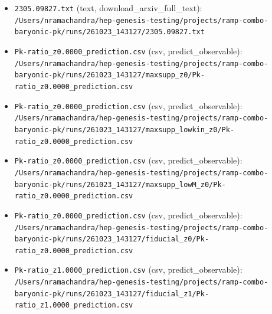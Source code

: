 \documentclass[11pt,a4paper]{article}
\begin{document}
\begin{itemize}
  \item \texttt{2305.09827.txt} (text, download\_arxiv\_full\_text): \texttt{/\allowbreak{}Users/\allowbreak{}nramachandra/\allowbreak{}hep-genesis-testing/\allowbreak{}projects/\allowbreak{}ramp-combo-baryonic-pk/\allowbreak{}runs/\allowbreak{}261023\_\allowbreak{}143127/\allowbreak{}2305.09827.txt}
  \item \texttt{Pk-ratio\_\allowbreak{}z0.0000\_\allowbreak{}prediction.csv} (csv, predict\_observable): \texttt{/\allowbreak{}Users/\allowbreak{}nramachandra/\allowbreak{}hep-genesis-testing/\allowbreak{}projects/\allowbreak{}ramp-combo-baryonic-pk/\allowbreak{}runs/\allowbreak{}261023\_\allowbreak{}143127/\allowbreak{}maxsupp\_\allowbreak{}z0/\allowbreak{}Pk-ratio\_\allowbreak{}z0.0000\_\allowbreak{}prediction.csv}
  \item \texttt{Pk-ratio\_\allowbreak{}z0.0000\_\allowbreak{}prediction.csv} (csv, predict\_observable): \texttt{/\allowbreak{}Users/\allowbreak{}nramachandra/\allowbreak{}hep-genesis-testing/\allowbreak{}projects/\allowbreak{}ramp-combo-baryonic-pk/\allowbreak{}runs/\allowbreak{}261023\_\allowbreak{}143127/\allowbreak{}maxsupp\_\allowbreak{}lowkin\_\allowbreak{}z0/\allowbreak{}Pk-ratio\_\allowbreak{}z0.0000\_\allowbreak{}prediction.csv}
  \item \texttt{Pk-ratio\_\allowbreak{}z0.0000\_\allowbreak{}prediction.csv} (csv, predict\_observable): \texttt{/\allowbreak{}Users/\allowbreak{}nramachandra/\allowbreak{}hep-genesis-testing/\allowbreak{}projects/\allowbreak{}ramp-combo-baryonic-pk/\allowbreak{}runs/\allowbreak{}261023\_\allowbreak{}143127/\allowbreak{}maxsupp\_\allowbreak{}lowM\_\allowbreak{}z0/\allowbreak{}Pk-ratio\_\allowbreak{}z0.0000\_\allowbreak{}prediction.csv}
  \item \texttt{Pk-ratio\_\allowbreak{}z0.0000\_\allowbreak{}prediction.csv} (csv, predict\_observable): \texttt{/\allowbreak{}Users/\allowbreak{}nramachandra/\allowbreak{}hep-genesis-testing/\allowbreak{}projects/\allowbreak{}ramp-combo-baryonic-pk/\allowbreak{}runs/\allowbreak{}261023\_\allowbreak{}143127/\allowbreak{}fiducial\_\allowbreak{}z0/\allowbreak{}Pk-ratio\_\allowbreak{}z0.0000\_\allowbreak{}prediction.csv}
  \item \texttt{Pk-ratio\_\allowbreak{}z1.0000\_\allowbreak{}prediction.csv} (csv, predict\_observable): \texttt{/\allowbreak{}Users/\allowbreak{}nramachandra/\allowbreak{}hep-genesis-testing/\allowbreak{}projects/\allowbreak{}ramp-combo-baryonic-pk/\allowbreak{}runs/\allowbreak{}261023\_\allowbreak{}143127/\allowbreak{}fiducial\_\allowbreak{}z1/\allowbreak{}Pk-ratio\_\allowbreak{}z1.0000\_\allowbreak{}prediction.csv}

\end{itemize}
\end{document}
